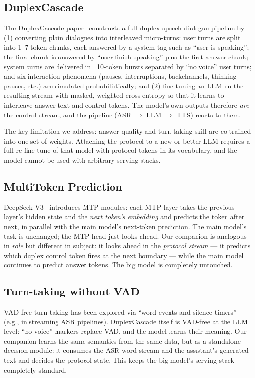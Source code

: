 \documentclass[conference]{IEEEtran}
\begin{document}
\subsection{DuplexCascade}
The DuplexCascade paper~\cite{duplexcascade} constructs a full-duplex speech
dialogue pipeline by (1) converting plain dialogues into interleaved
micro-turns: user turns are split into 1--7-token chunks, each answered by a
system tag such as ``user is speaking''; the final chunk is answered by
``user finish speaking'' plus the first answer chunk; system turns are
delivered in ~10-token bursts separated by ``no voice'' user turns; and six
interaction phenomena (pauses, interruptions, backchannels, thinking pauses,
etc.) are simulated probabilistically; and (2) fine-tuning an LLM on the
resulting stream with masked, weighted cross-entropy so that it learns to
interleave answer text and control tokens. The model's own outputs therefore
\emph{are} the control stream, and the pipeline (ASR $\rightarrow$ LLM
$\rightarrow$ TTS) reacts to them.

The key limitation we address: answer quality and turn-taking skill are
co-trained into one set of weights. Attaching the protocol to a new or
better LLM requires a full re-fine-tune of that model with protocol tokens
in its vocabulary, and the model cannot be used with arbitrary serving
stacks.

\subsection{MultiToken Prediction}
DeepSeek-V3~\cite{deepseek} introduces MTP modules: each MTP layer takes the
previous layer's hidden state and the \emph{next token's embedding} and
predicts the token after next, in parallel with the main model's next-token
prediction. The main model's task is unchanged; the MTP head just looks
ahead. Our companion is analogous in \emph{role} but different in subject:
it looks ahead in the \emph{protocol stream} — it predicts which duplex
control token fires at the next boundary — while the main model continues to
predict answer tokens. The big model is completely untouched.

\subsection{Turn-taking without VAD}
VAD-free turn-taking has been explored via ``word events and silence
timers'' (e.g., in streaming ASR pipelines). DuplexCascade itself is
VAD-free at the LLM level: ``no voice'' markers replace VAD, and the model
learns their meaning. Our companion learns the same semantics from the same
data, but as a standalone decision module: it consumes the ASR word stream
and the assistant's generated text and decides the protocol state. This
keeps the big model's serving stack completely standard.
\end{document}
